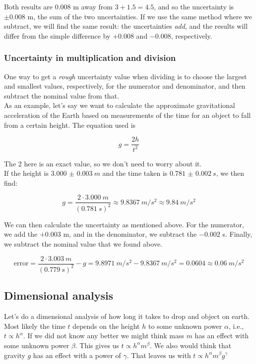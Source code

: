 Both results are $0.008$ m away from $3 + 1.5 = 4.5$, and so the uncertainty is $\pm 0.008$ m, the sum of the two uncertainties.  
If we use the same method where we subtract, we will find the same result: the uncertainties \emph{add}, and the results will differ from the simple difference by $+0.008$ and $-0.008$, respectively.

\subsubsection{Uncertainty in multiplication and division}
One way to get a \emph{rough} uncertainty value when dividing is to choose the largest and smallest values, respectively, for the numerator and denominator, and then subtract the nominal value from that.\\
As an example, let's say we want to calculate the approximate gravitational acceleration of the Earth based on measurements of the time for an object to fall from a certain height. The equation used is

\begin{equation}
 g = \frac{2 h}{t^2}
\end{equation}

The 2 here is an exact value, so we don't need to worry about it.\\
If the height is $\SI{3.000(3)}{m}$ and the time taken is $\SI{0.781(2)}{s}$, we then find:


\begin{equation}
g = \frac{2\cdot\SI{3.000}{m}}{(\SI{0.781}{s})^2} \approx \SI{9.8367}{m/s^2} \approx \SI{9.84}{m/s^2}
\end{equation}

We can then calculate the uncertainty as mentioned above. For the numerator, we add the $+ 0.003$ m, and in the denominator, we subtract the $- 0.002$ s. Finally, we subtract the nominal value that we found above.

\begin{equation}
\text{error} = \frac{2 \cdot \SI{3.003}{m}}{(\SI{0.779}{s})^2} - g = \SI{9.8971}{m/s^2} - \SI{9.8367}{m/s^2} = 0.0604 \approx \SI{0.06}{m/s^2}
\end{equation}



\subsection{Dimensional analysis}

Let's do a dimensional analysis of how long it takes to drop and object on earth.
Most likely the time $t$ depends on the height $h$ to some unknown power $\alpha$, i.e., $t \propto h^\alpha$.
If we did not know any better we might think mass $m$ has an effect with some unknown power $\beta$.
This gives us $t \propto h^\alpha m^\beta$. We also would think that gravity $g$ has an effect with a power of $\gamma$. 
That leaves us with $t \propto h^\alpha m^\beta g^\gamma$

